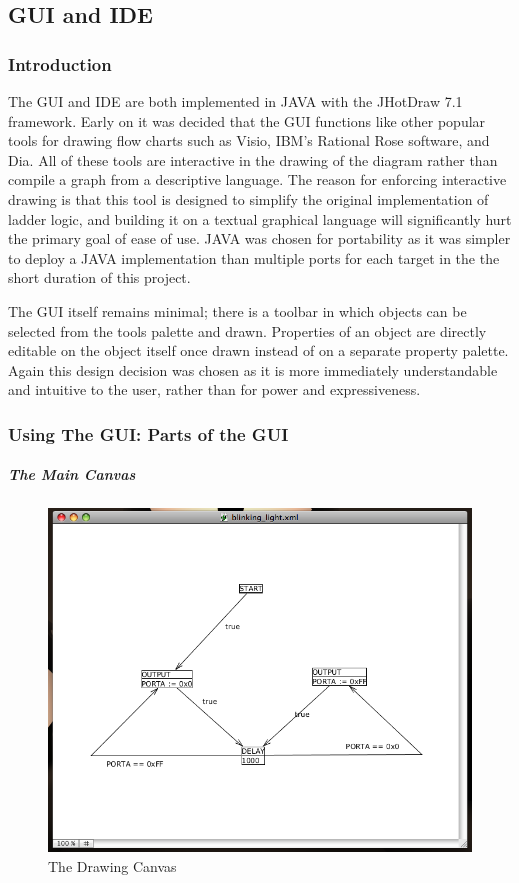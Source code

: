 \subsection{GUI and IDE}
\label{IDE}
\subsubsection{Introduction}

The GUI and IDE are both implemented in JAVA with the JHotDraw 7.1 framework. 
Early on it was decided that the GUI functions like other popular tools for 
drawing flow charts such as Visio, IBM's Rational Rose software, and Dia. 
All of these tools are interactive in the drawing of the diagram rather than 
compile a graph from a descriptive language. The reason for enforcing interactive 
drawing is that this tool is designed to simplify the original implementation 
of ladder logic, and building it on a textual graphical language will
significantly hurt the primary goal of ease of use.
JAVA was chosen for portability as it was simpler to deploy a JAVA implementation 
than multiple ports for each target in the the short duration of this project.

The GUI itself remains minimal; there is a toolbar in which objects can be 
selected from the tools palette and drawn. Properties of an object are 
directly editable on the object itself once drawn instead of on a separate 
property palette. Again this design decision was chosen as it is more 
immediately understandable and intuitive to the user, rather than for 
power and expressiveness.

\subsubsection{Using The GUI: Parts of the GUI}

\subparagraph{The Main Canvas}

\begin{figure}[htp]
    \centering
    \includegraphics[width=\imgmedium]{./images/plcedit_canvas.png}
    \caption{The Drawing Canvas}
    \label{fig:plcedit_canvas}
\end{figure}

